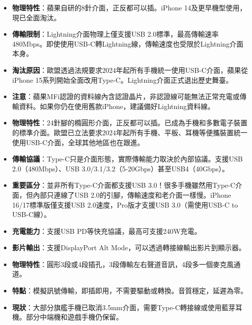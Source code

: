 
\begin{itemize}
  \item \textbf{物理特性}：蘋果自研的8針介面，正反都可以插。iPhone 14及更早機型使用，現已全面淘汰。
  \item \textbf{傳輸限制}：Lightning介面物理上僅支援USB 2.0標準，最高傳輸速率480Mbps。即使使用USB-C轉Lightning線，傳輸速度也受限於Lightning介面本身。
  \item \textbf{淘汰原因}：歐盟透過法規要求2024年起所有手機統一使用USB-C介面，蘋果從iPhone 15系列開始全面改用Type-C。Lightning介面正式退出歷史舞臺。
  \item \textbf{注意}：蘋果MFi認證的資料線內含認證晶片，非認證線可能無法正常充電或傳輸資料。如果你仍在使用舊款iPhone，建議備好Lightning資料線。
\end{itemize}


\begin{itemize}
  \item \textbf{物理特性}：24針腳的橢圓形介面，正反都可以插。已成為手機和多數電子裝置的標準介面。歐盟已立法要求2024年起所有手機、平板、耳機等便攜裝置統一使用USB-C介面，全球其他地區也在跟進。
  \item \textbf{傳輸協議}：Type-C只是介面形態，實際傳輸能力取決於內部協議。支援USB 2.0（480Mbps）、USB 3.0/3.1/3.2（5-20Gbps）甚至USB4（40Gbps）。
  \item \textbf{重要區分}：並非所有Type-C介面都支援USB 3.0！很多手機雖然用Type-C介面，但內部只連線了USB 2.0的引腳，傳輸速度和老介面一樣慢。iPhone 16/17標準版僅支援USB 2.0速度，Pro版才支援USB 3.0（需使用USB-C to USB-C線）。
  \item \textbf{充電能力}：支援USB PD等快充協議，最高可支援240W充電。
  \item \textbf{影片輸出}：支援DisplayPort Alt Mode，可以透過轉接線輸出影片到顯示器。
\end{itemize}


\begin{itemize}
  \item \textbf{物理特性}：圓形3段或4段插孔，3段傳輸左右聲道音訊，4段多一個麥克風通道。
  \item \textbf{特點}：模擬訊號傳輸，即插即用，不需要驅動或轉換。音質穩定，延遲為零。
  \item \textbf{現狀}：大部分旗艦手機已取消3.5mm介面，需要Type-C轉接線或使用藍芽耳機。部分中端機和遊戲手機仍保留。
\end{itemize}


